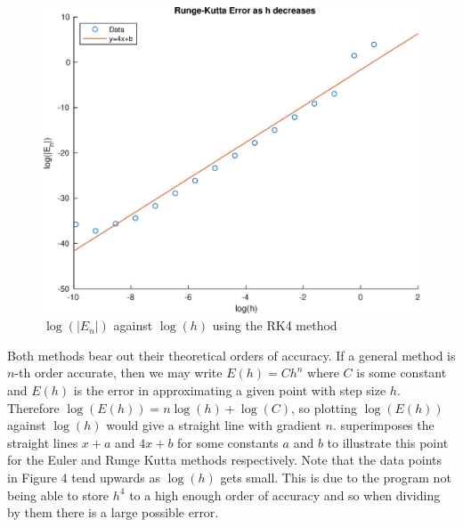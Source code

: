 \documentclass[10pt,a4paper,notitlepage]{article}
\begin{document}
\begin{figure}[H]
\begin{center}
\includegraphics[width=12cm]{Image_4_2}
\caption{$\log(|E_{n}|)$ against $\log(h)$ using the RK4 method}
\end{center}
\end{figure}
Both methods bear out their theoretical orders of accuracy. If a general method is $n$-th order accurate, then we may write $E(h)=Ch^{n}$ where $C$ is some constant and $E(h)$ is the error in approximating a given point with step size $h$.  Therefore $\log(E(h))=n\log(h)+\log(C)$, so plotting $\log(E(h))$ against $\log(h)$ would give a straight line with gradient $n$.  superimposes the straight lines $x+a$ and $4x+b$ for some constants $a$ and $b$ to illustrate this point for the Euler and Runge Kutta methods respectively. Note that the data points in Figure 4 tend upwards as $\log\left(h\right)$ gets small. This is due to the program not being able to store $h^{4}$ to a high enough order of accuracy and so when dividing by them there is a large possible error.
\end{document}
